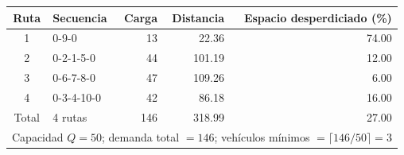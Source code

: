 \begin{tabular}{clrrr}
\toprule
Ruta & Secuencia & Carga & Distancia & Espacio desperdiciado (\%) \\
\midrule
1 & 0-9-0 & 13 & 22.36 & 74.00 \\
2 & 0-2-1-5-0 & 44 & 101.19 & 12.00 \\
3 & 0-6-7-8-0 & 47 & 109.26 & 6.00 \\
4 & 0-3-4-10-0 & 42 & 86.18 & 16.00 \\
\midrule
Total & 4 rutas & 146 & 318.99 & 27.00 \\
\midrule
\multicolumn{5}{l}{Capacidad $Q=50$; demanda total $=146$; vehículos mínimos $=\lceil 146/50 \rceil = 3$} \\
\bottomrule
\end{tabular}
